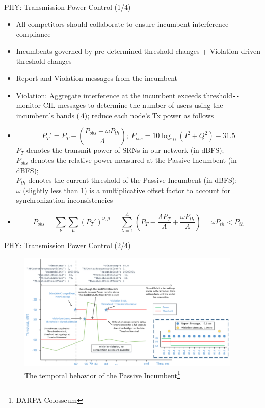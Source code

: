 \documentclass{beamer}
\begin{document}
\begin{frame}{PHY: Transmission Power Control (1/4)}
    \footnotesize{\begin{itemize}
        \item All competitors should collaborate to ensure incumbent interference compliance
        \item Incumbents governed by pre-determined threshold changes + Violation driven threshold changes
        \item Report and Violation messages from the incumbent
        \item Violation: Aggregate interference at the incumbent exceeds threshold\texttt{-{}-}monitor CIL messages to determine the number of users using the incumbent's bands ($\Lambda$); reduce each node's Tx power as follows
        \item \[P_{T}'=P_{T}-\left(\frac{P_{obs}-\omega P_{th}}{\Lambda}\right);\ P_{obs}=10\log_{10}(I^{2}{+}Q^{2})-31.5\]
        $P_{T}$ denotes the transmit power of SRNs in our network (in dBFS);
        \\$P_{obs}$ denotes the relative-power measured at the Passive Incumbent (in dBFS);
        \\$P_{th}$ denotes the current threshold of the Passive Incumbent (in dBFS);
        \\$\omega$ (slightly less than $1$) is a multiplicative offset factor to account for synchronization inconsistencies
        \item \[P_{obs}=\sum_{\nu}\sum_{\mu}(P_{T}')^{\nu,\mu}=\sum_{\lambda=1}^{\Lambda}\left(P_{T}-\frac{\Lambda P_{T}}{\Lambda}+\frac{{\omega}P_{th}}{\Lambda}\right)={\omega}P_{th}<P_{th}\]
    \end{itemize}}
\end{frame}
\begin{frame}{PHY: Transmission Power Control (2/4)}
\begin{figure}
    \centering
    \includegraphics[width = 0.95\textwidth]{Passive_Incumbent.jpg}
    \caption{The temporal behavior of the Passive Incumbent\footnote{\tiny{DARPA Colosseum}}}
    \label{fig:2}
\end{figure}
\end{frame}
\end{document}
